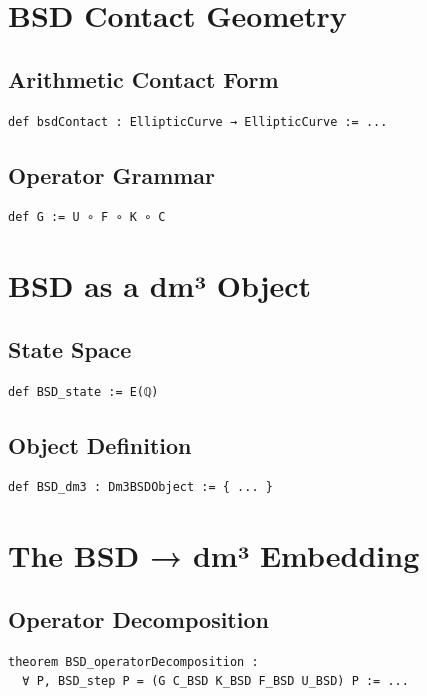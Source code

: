 \documentclass[11pt,a4paper]{article}
\begin{document}
\section{BSD Contact Geometry}

\subsection{Arithmetic Contact Form}
\begin{lstlisting}
def bsdContact : EllipticCurve → EllipticCurve := ...
\end{lstlisting}

\subsection{Operator Grammar}
\begin{lstlisting}
def G := U ∘ F ∘ K ∘ C
\end{lstlisting}

\section{BSD as a dm³ Object}

\subsection{State Space}
\begin{lstlisting}
def BSD_state := E(ℚ)
\end{lstlisting}

\subsection{Object Definition}
\begin{lstlisting}
def BSD_dm3 : Dm3BSDObject := { ... }
\end{lstlisting}

\section{The BSD → dm³ Embedding}

\subsection{Operator Decomposition}
\begin{lstlisting}
theorem BSD_operatorDecomposition :
  ∀ P, BSD_step P = (G C_BSD K_BSD F_BSD U_BSD) P := ...
\end{lstlisting}
\end{document}

